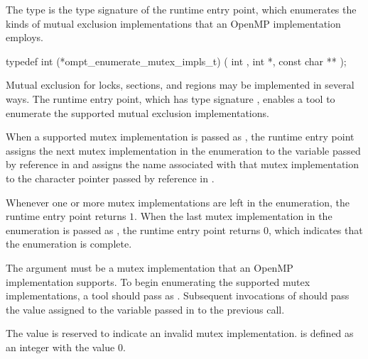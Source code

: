 \label{sec:ompt_enumerate_mutex_impls_t}
\label{sec:ompt_enumerate_mutex_impls}
\label{sec:ompt_mutex_impl_none}

\summary
The  type is the type signature of 
the  runtime entry point, which
enumerates the kinds of mutual exclusion implementations that an OpenMP 
implementation employs.

\format
\begin{ccppspecific}
\begin{omptInquiry}
typedef int (*ompt_enumerate_mutex_impls_t) (
  int ,
  int *,
  const char **
);
\end{omptInquiry}
\end{ccppspecific}

\descr
Mutual exclusion for locks,  sections, and  
regions may be implemented in several ways. The  
runtime entry point, which has type signature ,
enables a tool to enumerate the supported mutual exclusion implementations.

When a supported mutex implementation is passed as , the 
runtime entry point assigns the next mutex implementation in the enumeration 
to the variable passed by reference in  and assigns the name 
associated with that mutex implementation to the character pointer passed by 
reference in .

Whenever one or more mutex implementations are left in the enumeration, the 
 runtime entry point returns $1$. When the 
last mutex implementation in the enumeration is passed as , the 
runtime entry point returns $0$, which indicates that the enumeration is complete.

\argdesc
The  argument must be a mutex implementation that an OpenMP 
implementation supports. To begin enumerating the supported mutex implementations, 
a tool should pass  as . 
Subsequent invocations of  should pass the
value assigned to the variable passed in  to the previous call.

The value  is reserved to indicate an invalid 
mutex implementation.  is defined as an integer 
with the value 0.

